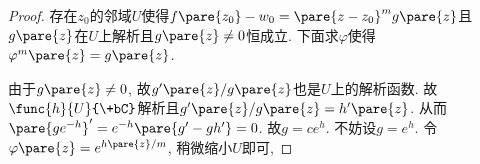 \documentclass{ctexart}
\begin{document}
\begin{proof}
    存在$z_0$的邻域$U$使得$f\pare{z_0} - w_0 = \pare{z-z_0}^m g\pare{z}$且$g\pare{z}$在$U$上解析且$g\pare{z} \neq 0$恒成立. 下面求$\varphi$使得$\varphi^m\pare{z} = g\pare{z}$.
    \par
    由于$g\pare{z}\neq 0$, 故$g'\pare{z}/g\pare{z}$也是$U$上的解析函数. 故$\func{h}{U}{\+bC}$解析且$g'\pare{z}/g\pare{z} = h'\pare{z}$. 从而$\pare{ge^{-h}}' = e^{-h}\pare{g'-gh'} = 0$. 故$g=ce^{h}$. 不妨设$g = e^h$. 令$\varphi\pare{z} = e^{h\pare{z}/m}$, 稍微缩小$U$即可,
\end{proof}


\end{document}
